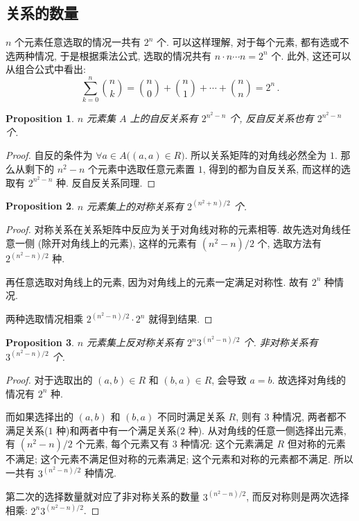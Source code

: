 \documentclass[UTF8]{ctexart}
\theoremstyle{mystyle}
\newtheorem{proposition}{Proposition}[section]
\theoremstyle{myremark}
\theoremstyle{plain}
\begin{document}
\subsection{关系的数量}
$ n $ 个元素任意选取的情况一共有 $ 2^n $ 个. 可以这样理解, 对于每个元素, 都有选或不选两种情况, 于是根据乘法公式, 选取的情况共有 $ n \cdot n \cdots n = 2^n $ 个. 此外, 这还可以从组合公式中看出: \[ \sum_{k = 0}^n \binom{n}{k} = \binom{n}{0} + \binom{n}{1} + \cdots + \binom{n}{n} = 2^n \,.\] 

\begin{proposition}
    $ n $ 元素集 $ A $ 上的自反关系有 $ 2^{n^2 - n} $ 个, 反自反关系也有 $ 2^{n^2 - n} $ 个.
\end{proposition}

\begin{proof}
    自反的条件为 $ \forall a \in A \bigl( (a, a) \in R \bigr) $. 所以关系矩阵的对角线必然全为 $ 1 $. 那么从剩下的 $ n^2 - n $ 个元素中选取任意元素置 $ 1 $, 得到的都为自反关系, 而这样的选取有 $ 2^{n^2 - n} $ 种. 反自反关系同理. 
\end{proof}

\begin{proposition}
    $ n $ 元素集上的对称关系有 $ 2^{(n^2 + n) / 2} $ 个.
\end{proposition}

\begin{proof}
    对称关系在关系矩阵中反应为关于对角线对称的元素相等. 故先选对角线任意一侧 (除开对角线上的元素), 这样的元素有 $ (n^2 - n) / 2 $ 个, 选取方法有 $ 2^{(n^2 - n) / 2} $ 种.

    再任意选取对角线上的元素, 因为对角线上的元素一定满足对称性. 故有 $ 2^n $ 种情况.

    两种选取情况相乘 $ 2^{(n^2 - n) / 2} \cdot 2^{n} $ 就得到结果.
\end{proof}

\begin{proposition}
    $ n $ 元素集上反对称关系有 $ 2^n 3^{(n^2-n)/2} $ 个. 非对称关系有 $ 3^{(n^2-n)/2} $ 个.
\end{proposition}

\begin{proof}
    对于选取出的 $ (a, b) \in R $ 和 $ (b, a) \in R $, 会导致 $ a = b $. 故选择对角线的情况有 $ 2^n $ 种.

    而如果选择出的 $ (a, b) $ 和 $ (b, a) $ 不同时满足关系 $ R $, 则有 $ 3 $ 种情况, 两者都不满足关系($ 1 $ 种)和两者中有一个满足关系($ 2 $ 种). 从对角线的任意一侧选择出元素, 有 $ (n^2 - n)/2 $ 个元素, 每个元素又有 $ 3 $ 种情况: 这个元素满足 $ R $ 但对称的元素不满足; 这个元素不满足但对称的元素满足; 这个元素和对称的元素都不满足. 所以一共有 $ 3^{(n^2 - n)/2} $ 种情况.

    第二次的选择数量就对应了非对称关系的数量 $ 3^{(n^2 - n)/2} $, 而反对称则是两次选择相乘: $ 2^n 3^{(n^2-n)/2} $.
\end{proof}
\end{document}
